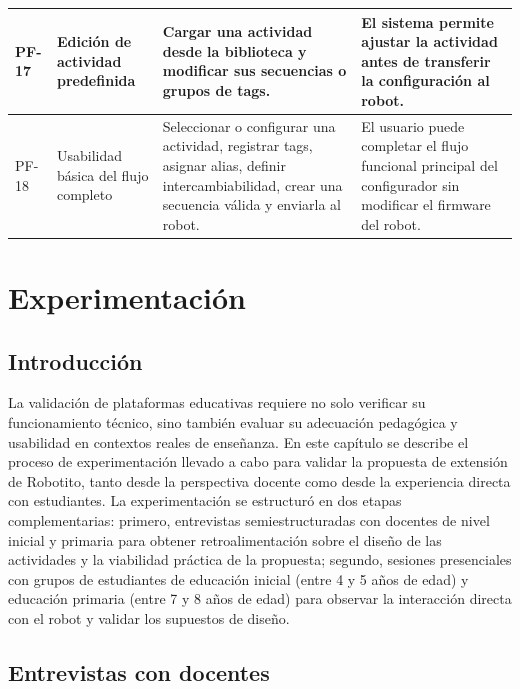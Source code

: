 \documentclass{prgrado}
\begin{document}
\begin{longtable}{L{0.10\textwidth} L{0.25\textwidth} L{0.33\textwidth} L{0.26\textwidth}}
PF-17 & Edición de actividad predefinida & Cargar una actividad desde la biblioteca y modificar sus secuencias o grupos de tags. & El sistema permite ajustar la actividad antes de transferir la configuración al robot. \\
\midrule

PF-18 & Usabilidad básica del flujo completo & Seleccionar o configurar una actividad, registrar tags, asignar alias, definir intercambiabilidad, crear una secuencia válida y enviarla al robot. & El usuario puede completar el flujo funcional principal del configurador sin modificar el firmware del robot. \\
\bottomrule


\end{longtable}



\chapter{Experimentación}

\section{Introducción}
La validación de plataformas educativas requiere no solo verificar su funcionamiento técnico, sino también evaluar su adecuación pedagógica y usabilidad en contextos reales de enseñanza. En este capítulo se describe el proceso de experimentación llevado a cabo para validar la propuesta de extensión de Robotito, tanto desde la perspectiva docente como desde la experiencia directa con estudiantes.
La experimentación se estructuró en dos etapas complementarias: primero, entrevistas semiestructuradas con docentes de nivel inicial y primaria para obtener retroalimentación sobre el diseño de las actividades y la viabilidad práctica de la propuesta; segundo, sesiones presenciales con grupos de estudiantes de educación inicial (entre 4 y 5 años de edad) y educación primaria (entre 7 y 8 años de edad) para observar la interacción directa con el robot y validar los supuestos de diseño.

\section{Entrevistas con docentes}
\end{document}
